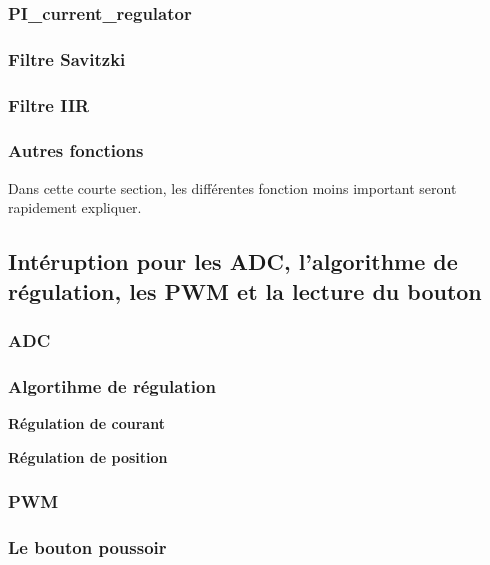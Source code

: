 \subsubsection{PI\_current\_regulator}

\subsubsection{Filtre Savitzki}

\subsubsection{Filtre IIR}

\subsubsection{Autres fonctions}
Dans cette courte section, les différentes fonction moins important seront rapidement expliquer.

\subsection{Intéruption pour les ADC, l'algorithme de régulation, les PWM et la lecture du bouton}

\subsubsection{ADC}

\subsubsection{Algortihme de régulation}

\textbf{Régulation de courant}

\textbf{Régulation de position}

\subsubsection{PWM}

\subsubsection{Le bouton poussoir}

\subsubsection{}

